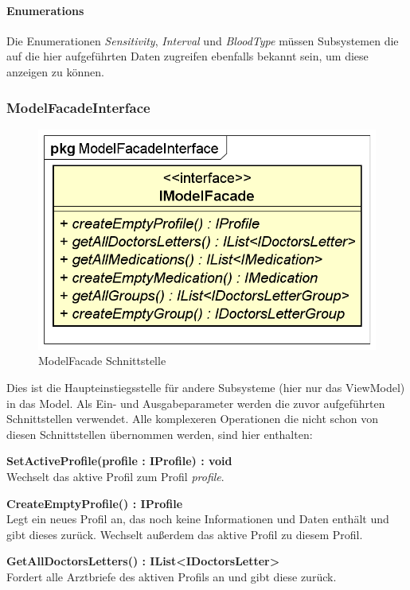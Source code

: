 \documentclass[a4paper]{scrreprt}
\begin{document}
\paragraph{Enumerations}
Die Enumerationen \textit{Sensitivity}, \textit{Interval} und \textit{BloodType} müssen Subsystemen die auf die hier aufgeführten Daten zugreifen ebenfalls bekannt sein, um diese anzeigen zu können.

\subsubsection{ModelFacadeInterface}
\begin{figure}[H]
\centering
\includegraphics[width=0.55\textheight]{graphics/Klassendiagramme/Model/ModelFacadeInterface.png}
\caption{ModelFacade Schnittstelle}
\end{figure}
Dies ist die Haupteinstiegsstelle für andere Subsysteme (hier nur das ViewModel) in das Model. Als Ein- und Ausgabeparameter werden die zuvor aufgeführten Schnittstellen verwendet. Alle komplexeren Operationen die nicht schon von diesen Schnittstellen übernommen werden, sind hier enthalten:


\textbf{SetActiveProfile(profile : IProfile) : void}\\
Wechselt das aktive Profil zum Profil \textit{profile}.

\textbf{CreateEmptyProfile() : IProfile}\\
Legt ein neues Profil an, das noch keine Informationen und Daten enthält und gibt dieses zurück. Wechselt außerdem das aktive Profil zu diesem Profil.

\textbf{GetAllDoctorsLetters() : IList<IDoctorsLetter>}\\
Fordert alle Arztbriefe des aktiven Profils an und gibt diese zurück.
\end{document}
